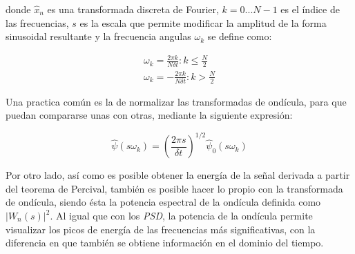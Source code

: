 donde $\hat{x}_n$ es una transformada discreta de Fourier, $k=0...N-1$ es el índice de las frecuencias, $s$ es la escala que permite modificar la amplitud de la forma sinusoidal resultante y la frecuencia angulas $\omega_k$ se define como:

\begin{equation}
    \begin{split}
        \omega_k = \frac{2 \pi k}{N {\displaystyle \delta} t} : k \le \frac{N}{2}\\
        \omega_k = - \frac{2 \pi k}{N {\displaystyle \delta} t} : k > \frac{N}{2}
    \end{split}
\end{equation}

Una practica común \cite{book_analysis_Method_multiSp_data, guide_wavelet_routines} es la de normalizar las transformadas de ondícula, para que puedan compararse unas con otras, mediante la siguiente expresión:

\begin{equation}
    \hat{\psi}(s \omega_k) = (\frac{2 \pi s}{{\displaystyle \delta} t} )^{1/2} \hat{\psi}_0 (s \omega_k)
\end{equation}

Por otro lado, así como es posible obtener la energía de la señal derivada a partir del teorema de Percival, también es posible hacer lo propio con la transformada de ondícula, siendo ésta la potencia espectral de la ondícula definida como $|W_n(s)|^2$. Al igual que con los \emph{PSD}, la potencia de la ondícula permite visualizar los picos de energía de las frecuencias más significativas, con la diferencia en que también se obtiene información en el dominio del tiempo.
